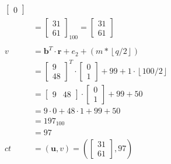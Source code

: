 \begin{align*}
\begin{bmatrix}
    0
  \end{bmatrix}                                                                        \\
             & = \begin{bmatrix}
                   31 \\ 
                   61 
                 \end{bmatrix}_{100}
  = 
  \begin{bmatrix}
    31 \\
    61
  \end{bmatrix}                                                                        \\
  \\
  v          & = \textbf{b}^T \cdot \textbf{r} + e_2 + (m*\left\lfloor q/2\right\rfloor) \\
             & =\begin{bmatrix}
                  9 \\
                  48
                \end{bmatrix}^T
  \cdot
  \begin{bmatrix}
    0 \\
    1
  \end{bmatrix}
  + 99 + 1 \cdot \left\lfloor 100/2\right\rfloor                                         \\
             & =\begin{bmatrix}
                  9 & 48
                \end{bmatrix}
  \cdot
  \begin{bmatrix}
    0 \\ 
    1 
  \end{bmatrix}
  + 99 + 50                                                                              \\
             & = 9 \cdot 0 +48 \cdot 1 + 99 + 50                                         \\
             & = 197_{100}                                                               \\
             & = 97                                                                      \\
  ct         & = (\textbf{u}, v) = \left (
  \begin{bmatrix}
      31 \\
      61
    \end{bmatrix}, 97   \right )                                                           \\
\end{align*}

